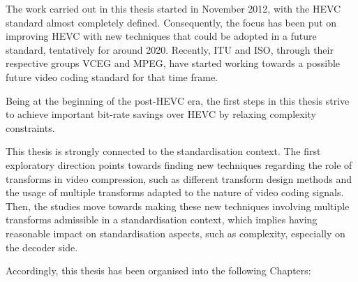 \documentclass[11pt,a4paper,openright,twoside]{book}
\numberwithin{equation}{section} %
\numberwithin{figure}{section} %
\numberwithin{table}{section} %
\begin{document}
\bigskip

The work carried out in this thesis started in November 2012, with the
\acs{HEVC} standard almost completely defined.
Consequently, the focus has been put on improving \acs{HEVC} with
new techniques that could be adopted in a future standard, tentatively for
around 2020.
Recently, \acs{ITU} and \acs{ISO}, through their respective groups \acs{VCEG}
and \acs{MPEG}, have started working towards a possible future video coding
standard for that time frame.

\bigskip

Being at the beginning of the post-\acs{HEVC} era, the first steps in this
thesis strive to achieve important bit-rate savings over \acs{HEVC} by
relaxing complexity constraints.

This thesis is strongly connected to the standardisation context.
The first exploratory direction points towards finding new techniques
regarding the role of transforms in video compression, such as different
transform design methods and the usage of multiple transforms adapted to the
nature of video coding signals.
Then, the studies move towards making these new techniques involving multiple
transforms admissible in a standardisation context, which implies having
reasonable impact on standardisation aspects, such as complexity, especially
on the decoder side.

\bigskip

Accordingly, this thesis has been organised into the following Chapters:
\end{document}
